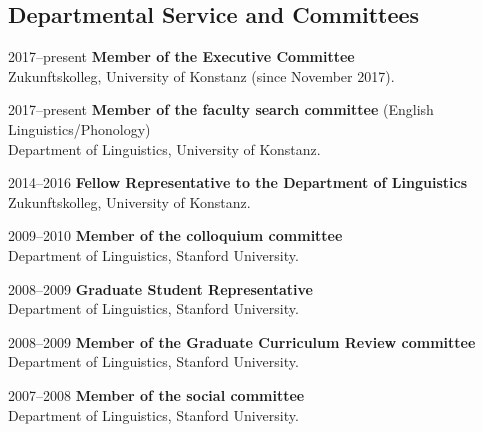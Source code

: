 \subsection*{Departmental Service and Committees}
\begin{dated}
	\item[2017--present]
		\textbf{Member of the Executive Committee}\\
		Zukunftskolleg, University of Konstanz (since November 2017).
	\item[2017--present]
		\textbf{Member of the faculty search committee} (English Linguistics/Phonology)\\
		Department of Linguistics, University of Konstanz.
	\item[2014--2016]
		\textbf{Fellow Representative to the Department of Linguistics}\\
	    Zukunftskolleg, University of Konstanz.
	\item[2009--2010]
		\textbf{Member of the colloquium committee}\\
		Department of Linguistics, Stanford University.
	\item[2008--2009]
		\textbf{Graduate Student Representative}\\
		Department of Linguistics, Stanford University.
	\item[2008--2009]
		\textbf{Member of the Graduate Curriculum Review committee}\\
		Department of Linguistics, Stanford University.
	\item[2007--2008]
		\textbf{Member of the social committee}\\
	    Department of Linguistics, Stanford University.
\end{dated}
